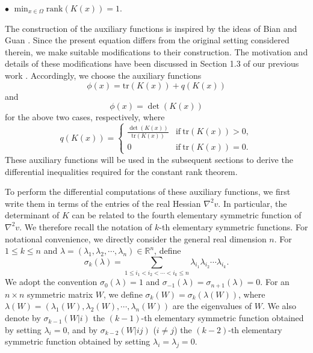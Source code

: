 \documentclass[11pt]{amsart}
\numberwithin{theorem}{section}
\numberwithin{equation}{section}
\begin{document}
$\bullet$ $\min_{x\in\Omega}\mathrm{rank}(K(x))=1$.

The construction of the auxiliary functions is inspired by the ideas of Bian and Guan \cite{Bian-Guan2009}. Since the present equation differs from the original setting considered therein, we make suitable modifications to their construction. The motivation and details of these modifications have been discussed in Section 1.3 of our previous work \cite{Zhang-Zhou2025}. Accordingly, we choose the auxiliary functions 
\begin{equation}\label{Auxiliary function-l=2}
\phi(x)=\mathrm{tr}(K(x))+q(K(x))
\end{equation}
and $$\phi(x)=\det(K(x))$$ for the above two cases, respectively, where $$q(K(x))=\begin{cases}
\frac{\det(K(x))}{\mathrm{tr}(K(x))} & \mathrm{if}\ \mathrm{tr}(K(x))>0,\\
0 & \mathrm{if}\ \mathrm{tr}(K(x))=0.
\end{cases}$$ These auxiliary functions will be used in the subsequent sections to derive the differential inequalities required for the constant rank theorem.

To perform the differential computations of these auxiliary functions, we first write them in terms of the entries of the real Hessian $\nabla^2v$. In particular, the determinant of $K$ can be related to the fourth elementary symmetric function of $\nabla^2v$. We therefore recall the notation of $k$-th elementary symmetric functions. For notational convenience, we directly consider the general real dimension $n$. For $1\leq k\leq n$ and $\lambda=(\lambda_1,\lambda_2,\cdots,\lambda_n)\in\mathbb{R}^n$, define $$\sigma_k(\lambda)=\sum_{1\leq i_1<i_2<\cdots<i_k\leq n}\lambda_{i_1}\lambda_{i_2}\cdots\lambda_{i_k}.$$ We adopt the convention $\sigma_0(\lambda)=1$ and $\sigma_{-1}(\lambda)=\sigma_{n+1}(\lambda)=0$. For an $n\times n$ symmetric matrix $W$, we define $\sigma_k(W)=\sigma_k(\lambda(W))$, where $\lambda(W)=(\lambda_1(W),\lambda_2(W),\cdots,\lambda_n(W))$ are the eigenvalues of $W$. We also denote by $\sigma_{k-1}(W|i)$ the $(k-1)$-th elementary symmetric function obtained by setting $\lambda_i=0$, and by $\sigma_{k-2}(W|ij)$ ($i\neq j$) the $(k-2)$-th elementary symmetric function obtained by setting $\lambda_i=\lambda_j=0$.
\end{document}
